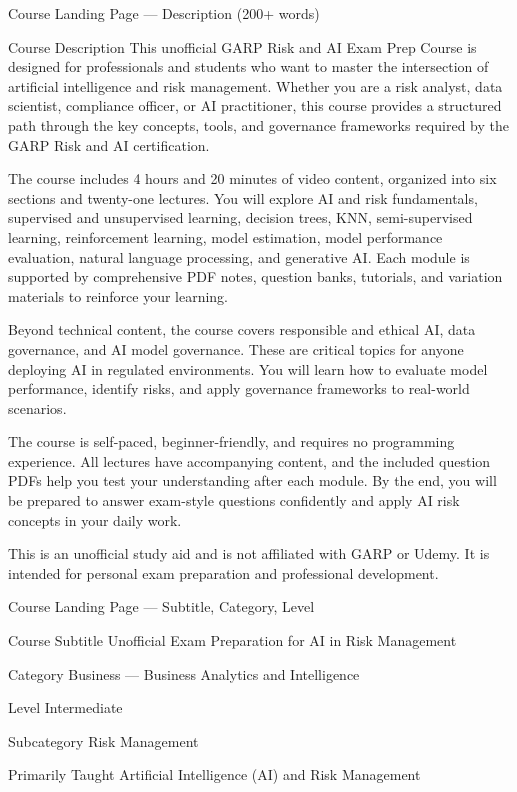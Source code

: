 \documentclass[aspectratio=169,11pt]{beamer}
\begin{document}
	\begin{frame}{Course Landing Page --- Description (200+ words)}
		\begin{block}{Course Description}
			\small
			This unofficial GARP Risk and AI Exam Prep Course is designed for professionals and students who want to master the intersection of artificial intelligence and risk management. Whether you are a risk analyst, data scientist, compliance officer, or AI practitioner, this course provides a structured path through the key concepts, tools, and governance frameworks required by the GARP Risk and AI certification.
			
			The course includes 4 hours and 20 minutes of video content, organized into six sections and twenty-one lectures. You will explore AI and risk fundamentals, supervised and unsupervised learning, decision trees, KNN, semi-supervised learning, reinforcement learning, model estimation, model performance evaluation, natural language processing, and generative AI. Each module is supported by comprehensive PDF notes, question banks, tutorials, and variation materials to reinforce your learning.
			
			Beyond technical content, the course covers responsible and ethical AI, data governance, and AI model governance. These are critical topics for anyone deploying AI in regulated environments. You will learn how to evaluate model performance, identify risks, and apply governance frameworks to real-world scenarios.
			
			The course is self-paced, beginner-friendly, and requires no programming experience. All lectures have accompanying content, and the included question PDFs help you test your understanding after each module. By the end, you will be prepared to answer exam-style questions confidently and apply AI risk concepts in your daily work.
			
			This is an unofficial study aid and is not affiliated with GARP or Udemy. It is intended for personal exam preparation and professional development.
		\end{block}
	\end{frame}
	
	\begin{frame}{Course Landing Page --- Subtitle, Category, Level}
		\begin{block}{Course Subtitle}
			Unofficial Exam Preparation for AI in Risk Management
		\end{block}
		\begin{block}{Category}
			Business --- Business Analytics and Intelligence
		\end{block}
		\begin{block}{Level}
			Intermediate
		\end{block}
		\begin{block}{Subcategory}
			Risk Management
		\end{block}
		\begin{block}{Primarily Taught}
			Artificial Intelligence (AI) and Risk Management
		\end{block}
	\end{frame}
	
\end{document}
